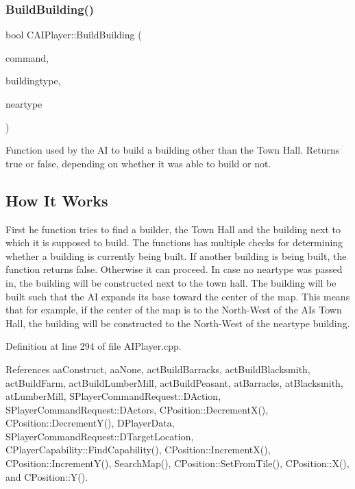 \subsubsection{\texorpdfstring{Build\+Building()}{BuildBuilding()}}
{\footnotesize\ttfamily bool C\+A\+I\+Player\+::\+Build\+Building (\begin{DoxyParamCaption}\item[{\hyperlink{structSPlayerCommandRequest}{S\+Player\+Command\+Request} \&}]{command,  }\item[{\hyperlink{GameDataTypes_8h_a5600d4fc433b83300308921974477fec}{E\+Asset\+Type}}]{buildingtype,  }\item[{\hyperlink{GameDataTypes_8h_a5600d4fc433b83300308921974477fec}{E\+Asset\+Type}}]{neartype }\end{DoxyParamCaption})\hspace{0.3cm}{\ttfamily [protected]}}



Function used by the AI to build a building other than the Town Hall. Returns true or false, depending on whether it was able to build or not. 

\hypertarget{classCAIPlayer_bthhow_sec}{}\subsection{How It Works}\label{classCAIPlayer_bthhow_sec}
First he function tries to find a builder, the Town Hall and the building next to which it is supposed to build. The functions has multiple checks for determining whether a building is currently being built. If another building is being built, the function returns false. Otherwise it can proceed. In case no neartype was passed in, the building will be constructed next to the town hall. The building will be built such that the AI expands its base toward the center of the map. This means that for example, if the center of the map is to the North-\/\+West of the AI\textquotesingle{}s Town Hall, the building will be constructed to the North-\/\+West of the neartype building. 

Definition at line 294 of file A\+I\+Player.\+cpp.



References aa\+Construct, aa\+None, act\+Build\+Barracks, act\+Build\+Blacksmith, act\+Build\+Farm, act\+Build\+Lumber\+Mill, act\+Build\+Peasant, at\+Barracks, at\+Blacksmith, at\+Lumber\+Mill, S\+Player\+Command\+Request\+::\+D\+Action, S\+Player\+Command\+Request\+::\+D\+Actors, C\+Position\+::\+Decrement\+X(), C\+Position\+::\+Decrement\+Y(), D\+Player\+Data, S\+Player\+Command\+Request\+::\+D\+Target\+Location, C\+Player\+Capability\+::\+Find\+Capability(), C\+Position\+::\+Increment\+X(), C\+Position\+::\+Increment\+Y(), Search\+Map(), C\+Position\+::\+Set\+From\+Tile(), C\+Position\+::\+X(), and C\+Position\+::\+Y().



